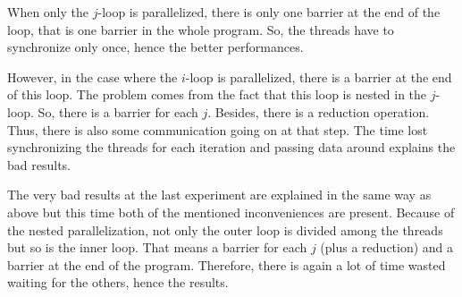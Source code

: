 When only the $j$-loop is parallelized, there is only one barrier at the end of the loop, that is one barrier in the whole program. So, the threads have to synchronize only once, hence the better performances.

However, in the case where the $i$-loop is parallelized, there is a barrier at the end of this loop. The problem comes from the fact that this loop is nested in the $j$-loop. So, there is a barrier for each $j$. Besides, there is a reduction operation. Thus, there is also some communication going on at that step. The time lost synchronizing the threads for each iteration and passing data around explains the bad results.

The very bad results at the last experiment are explained in the same way as above but this time both of the mentioned inconveniences are present. Because of the nested parallelization, not only the outer loop is divided among the threads but so is the inner loop. That means a barrier for each $j$ (plus a reduction) and a barrier at the end of the program. Therefore, there is again a lot of time wasted waiting for the others, hence the results.     
